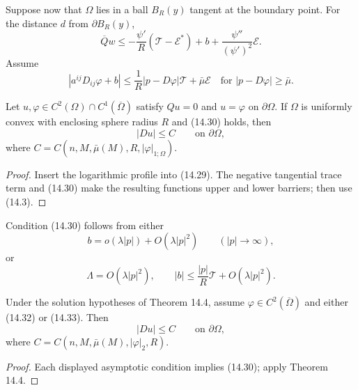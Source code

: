 Suppose now that $\Omega$ lies in a ball $B_R(y)$ tangent at the boundary point.
For the distance $d$ from $\partial B_R(y)$,
\begin{equation}
\overline Qw
\leq-\frac{\psi'}R(\mathcal T-\mathcal E^*)+b
+\frac{\psi''}{(\psi')^2}\mathcal E.
\tag{14.29}
\end{equation}
Assume
\begin{equation}
|a^{ij}D_{ij}\varphi+b|
\leq\frac1R|p-D\varphi|\mathcal T+\bar\mu\mathcal E
\quad\text{for }|p-D\varphi|\geq\bar\mu.
\tag{14.30}
\end{equation}

\begin{theorem}
\label{gt14-boundary-gradient-14-4}
Let $u,\varphi\in C^2(\Omega)\cap C^1(\overline\Omega)$ satisfy $Qu=0$ and
$u=\varphi$ on $\partial\Omega$. If $\Omega$ is uniformly convex with enclosing
sphere radius $R$ and (14.30) holds, then
\begin{equation}
|Du|\leq C\qquad\text{on }\partial\Omega,
\tag{14.31}
\end{equation}
where $C=C(n,M,\bar\mu(M),R,|\varphi|_{1;\Omega})$.
\end{theorem}
\begin{proof}
\sketch Insert the logarithmic profile into (14.29). The negative tangential
trace term and (14.30) make the resulting functions upper and lower barriers;
then use (14.3).
\end{proof}

Condition (14.30) follows from either
\begin{equation}
b=o(\lambda|p|)+O(\lambda|p|^2)
\qquad(|p|\to\infty),
\tag{14.32}
\end{equation}
or
\begin{equation}
\Lambda=O(\lambda|p|^2),\qquad
|b|\leq\frac{|p|}{R}\mathcal T+O(\lambda|p|^2).
\tag{14.33}
\end{equation}

\begin{corollary}
\label{gt14-boundary-gradient-14-5}
Under the solution hypotheses of Theorem 14.4, assume
$\varphi\in C^2(\overline\Omega)$ and either (14.32) or (14.33). Then
\begin{equation}
|Du|\leq C\qquad\text{on }\partial\Omega,
\tag{14.34}
\end{equation}
where $C=C(n,M,\bar\mu(M),|\varphi|_2,R)$.
\end{corollary}
\begin{proof}
\sketch Each displayed asymptotic condition implies (14.30); apply Theorem 14.4.
\end{proof}

